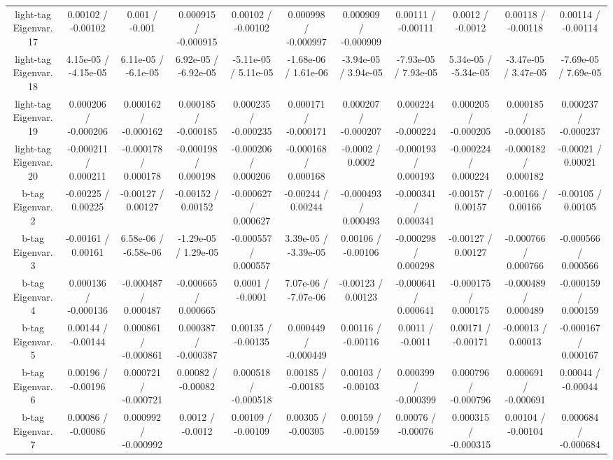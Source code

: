 \begin{table}[htbp]
\begin{center}
\begin{tabular}{|c|c|c|c|c|c|c|c|c|c|c|}
  light-tag Eigenvar. 17 & 0.00102 / -0.00102 & 0.001 / -0.001 & 0.000915 / -0.000915 & 0.00102 / -0.00102 & 0.000998 / -0.000997 & 0.000909 / -0.000909 & 0.00111 / -0.00111 & 0.0012 / -0.0012 & 0.00118 / -0.00118 & 0.00114 / -0.00114 \\ 
  light-tag Eigenvar. 18 & 4.15e-05 / -4.15e-05 & 6.11e-05 / -6.1e-05 & 6.92e-05 / -6.92e-05 & -5.11e-05 / 5.11e-05 & -1.68e-06 / 1.61e-06 & -3.94e-05 / 3.94e-05 & -7.93e-05 / 7.93e-05 & 5.34e-05 / -5.34e-05 & -3.47e-05 / 3.47e-05 & -7.69e-05 / 7.69e-05 \\ 
  light-tag Eigenvar. 19 & 0.000206 / -0.000206 & 0.000162 / -0.000162 & 0.000185 / -0.000185 & 0.000235 / -0.000235 & 0.000171 / -0.000171 & 0.000207 / -0.000207 & 0.000224 / -0.000224 & 0.000205 / -0.000205 & 0.000185 / -0.000185 & 0.000237 / -0.000237 \\ 
  light-tag Eigenvar. 20 & -0.000211 / 0.000211 & -0.000178 / 0.000178 & -0.000198 / 0.000198 & -0.000206 / 0.000206 & -0.000168 / 0.000168 & -0.0002 / 0.0002 & -0.000193 / 0.000193 & -0.000224 / 0.000224 & -0.000182 / 0.000182 & -0.00021 / 0.00021 \\ 
  b-tag Eigenvar. 2 & -0.00225 / 0.00225 & -0.00127 / 0.00127 & -0.00152 / 0.00152 & -0.000627 / 0.000627 & -0.00244 / 0.00244 & -0.000493 / 0.000493 & -0.000341 / 0.000341 & -0.00157 / 0.00157 & -0.00166 / 0.00166 & -0.00105 / 0.00105 \\ 
  b-tag Eigenvar. 3 & -0.00161 / 0.00161 & 6.58e-06 / -6.58e-06 & -1.29e-05 / 1.29e-05 & -0.000557 / 0.000557 & 3.39e-05 / -3.39e-05 & 0.00106 / -0.00106 & -0.000298 / 0.000298 & -0.00127 / 0.00127 & -0.000766 / 0.000766 & -0.000566 / 0.000566 \\ 
  b-tag Eigenvar. 4 & 0.000136 / -0.000136 & -0.000487 / 0.000487 & -0.000665 / 0.000665 & 0.0001 / -0.0001 & 7.07e-06 / -7.07e-06 & -0.00123 / 0.00123 & -0.000641 / 0.000641 & -0.000175 / 0.000175 & -0.000489 / 0.000489 & -0.000159 / 0.000159 \\ 
  b-tag Eigenvar. 5 & 0.00144 / -0.00144 & 0.000861 / -0.000861 & 0.000387 / -0.000387 & 0.00135 / -0.00135 & 0.000449 / -0.000449 & 0.00116 / -0.00116 & 0.0011 / -0.0011 & 0.00171 / -0.00171 & -0.00013 / 0.00013 & -0.000167 / 0.000167 \\ 
  b-tag Eigenvar. 6 & 0.00196 / -0.00196 & 0.000721 / -0.000721 & 0.00082 / -0.00082 & 0.000518 / -0.000518 & 0.00185 / -0.00185 & 0.00103 / -0.00103 & 0.000399 / -0.000399 & 0.000796 / -0.000796 & 0.000691 / -0.000691 & 0.00044 / -0.00044 \\ 
  b-tag Eigenvar. 7 & 0.00086 / -0.00086 & 0.000992 / -0.000992 & 0.0012 / -0.0012 & 0.00109 / -0.00109 & 0.00305 / -0.00305 & 0.00159 / -0.00159 & 0.00076 / -0.00076 & 0.000315 / -0.000315 & 0.00104 / -0.00104 & 0.000684 / -0.000684 \\ 

\end{tabular}
\end{center}
\end{table}

